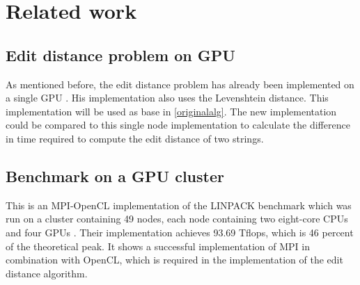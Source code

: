 \section{Related work}

\subsection{Edit distance problem on GPU}
As mentioned before, the edit distance problem has already been implemented on a single GPU \cite{Heus}.
His implementation also uses the Levenshtein distance.
This implementation will be used as base in \cref{originalalg}.
The new implementation could be compared to this single node implementation to calculate the difference in time required to compute the edit distance of two strings.

\subsection{Benchmark on a GPU cluster}
This is an MPI-OpenCL implementation of the LINPACK benchmark which was run on a cluster containing 49 nodes, each node containing two eight-core CPUs and four GPUs \cite{Cluster}.
Their implementation achieves 93.69 Tflops, which is 46 percent of the theoretical peak.
It shows a successful implementation of MPI in combination with OpenCL, which is required in the implementation of the edit distance algorithm.
